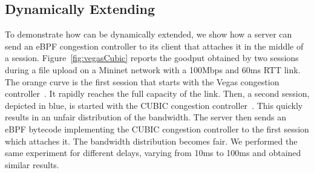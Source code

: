 \subsection{Dynamically Extending \tcpls}
%

To demonstrate how \tcpls can be dynamically extended, we show how a server can 
send an eBPF congestion controller to its client that attaches it in the middle 
of a \tcpls session. Figure~\ref{fig:vegasCubic} reports the goodput obtained 
by two \tcpls sessions during a file upload on a Mininet network with a 
100Mbps and 60ms RTT link.
The orange curve is the first \tcpls session that starts with the Vegas 
congestion controller~\cite{10.1145/190314.190317}. It rapidly reaches the 
full capacity of the link. Then, a second \tcpls session, depicted in blue, is 
started with the CUBIC congestion controller~\cite{rfc8312}. This quickly 
results in an unfair distribution of the bandwidth. The server then sends an 
eBPF bytecode implementing the CUBIC congestion controller to the first \tcpls 
session which attaches it. The bandwidth distribution becomes fair. We 
performed the same experiment for different delays, varying from 10ms to 100ms 
and obtained similar results.

